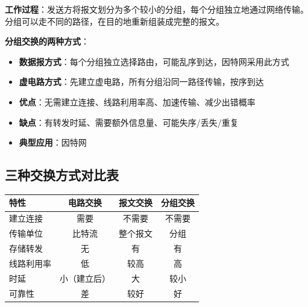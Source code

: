 \documentclass[12pt,a4paper,openany]{ctexbook}
\begin{document}
\textbf{工作过程}：发送方将报文划分为多个较小的分组，每个分组独立地通过网络传输。分组可以走不同的路径，在目的地重新组装成完整的报文。

\textbf{分组交换的两种方式}：
\begin{itemize}[leftmargin=2em,itemsep=0pt]
    \item \textbf{数据报方式}：每个分组独立选择路由，可能乱序到达，因特网采用此方式
    \item \textbf{虚电路方式}：先建立虚电路，所有分组沿同一路径传输，按序到达
\end{itemize}

\begin{itemize}[leftmargin=2em,itemsep=0pt]
    \item \textbf{优点}：无需建立连接、线路利用率高、加速传输、减少出错概率
    \item \textbf{缺点}：有转发时延、需要额外信息量、可能失序/丢失/重复
    \item \textbf{典型应用}：因特网
\end{itemize}

\subsection{三种交换方式对比表}
\begin{table}[htbp]
\centering\small
\begin{tabular}{lccc}
\toprule
\textbf{特性} & \textbf{电路交换} & \textbf{报文交换} & \textbf{分组交换} \\
\midrule
建立连接 & 需要 & 不需要 & 不需要 \\
传输单位 & 比特流 & 整个报文 & 分组 \\
存储转发 & 无 & 有 & 有 \\
线路利用率 & 低 & 较高 & 高 \\
时延 & 小（建立后） & 大 & 较小 \\
可靠性 & 差 & 较好 & 好 \\
\bottomrule
\end{tabular}
\end{table}
\end{document}
